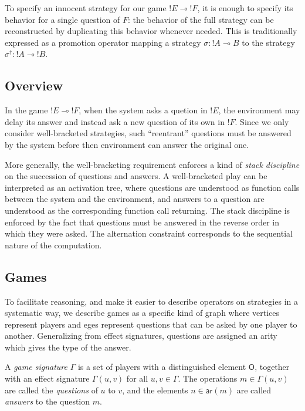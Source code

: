 \documentclass[sigplan,10pt,review,anonymous]{acmart}
\newcommand{\kw}[1]{\ensuremath{ \mathsf{#1} }}
\begin{document}
To specify an innocent strategy
for our game ${!E} \multimap {!F}$,
it is enough to specify its behavior
for a single question of $F$:
the behavior of the full strategy can be reconstructed
by duplicating this behavior whenever needed.
This is traditionally expressed as a promotion operator
mapping a strategy $\sigma : {!A} \multimap B$
to the strategy $\sigma^\dagger : {!A} \multimap {!B}$.


\subsection{Overview} %
\label{sec:arrow}

In the game ${!E} \multimap {!F}$,
when the system asks a quetion in ${!E}$,
the environment may delay its answer
and instead ask a new question of its own in ${!F}$.
Since we only consider well-bracketed strategies,
such ``reentrant'' questions must be answered by the system
before then environment can answer the original one.

More generally,
the well-bracketing requirement
enforces a kind of \emph{stack discipline}
on the succession of questions and answers.
A well-bracketed play
can be interpreted as an activation tree,
where questions are understood as function calls
between the system and the environment,
and answers to a question are understood as the
corresponding function call returning.
The stack discipline is enforced by the fact that
questions must be answered in the reverse order
in which they were asked.
The alternation constraint
corresponds to the sequential nature of the computation.


\subsection{Games} %

To facilitate reasoning,
and make it easier to describe operators on strategies
in a systematic way,
we describe games as a specific kind of graph
where vertices represent players
and eges represent questions that can be asked
by one player to another.
Generalizing from effect signatures,
questions are assigned an arity
which gives the type of the answer.

\begin{definition}
A \emph{game signature} $\Gamma$
is a set of players with a distinguished element $\kw{O}$,
together with an effect signature $\Gamma(u, v)$
for all $u, v \in \Gamma$.
The operations $m \in \Gamma(u, v)$ are called
the \emph{questions} of $u$ to $v$,
and the elements $n \in \kw{ar}(m)$ are called
\emph{answers} to the question $m$.
\end{definition}
\end{document}
